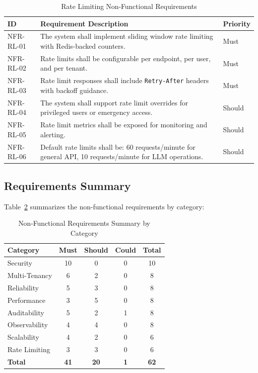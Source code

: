 \documentclass[a4paper,twoside]{sapthesis}
\begin{document}
\begin{table}[htbp]
\centering
\caption{Rate Limiting Non-Functional Requirements}
\label{tab:nfr-ratelimit}
\small
\begin{tabularx}{\textwidth}{|l|X|l|}
\hline
\textbf{ID} & \textbf{Requirement Description} & \textbf{Priority} \\
\midrule
NFR-RL-01 & The system shall implement sliding window rate limiting with Redis-backed counters. & Must \\
\midrule
NFR-RL-02 & Rate limits shall be configurable per endpoint, per user, and per tenant. & Must \\
\midrule
NFR-RL-03 & Rate limit responses shall include \texttt{Retry-After} headers with backoff guidance. & Must \\
\midrule
NFR-RL-04 & The system shall support rate limit overrides for privileged users or emergency access. & Should \\
\midrule
NFR-RL-05 & Rate limit metrics shall be exposed for monitoring and alerting. & Should \\
\midrule
NFR-RL-06 & Default rate limits shall be: 60 requests/minute for general API, 10 requests/minute for LLM operations. & Should \\
\midrule
\end{tabularx}
\end{table}

\subsection{Requirements Summary}
\label{subsec:nfr-summary}

Table~\ref{tab:nfr-summary} summarizes the non-functional requirements by category:

\begin{table}[htbp]
\centering
\caption{Non-Functional Requirements Summary by Category}
\label{tab:nfr-summary}
\begin{tabular}{|l|c|c|c|c|}
\hline
\textbf{Category} & \textbf{Must} & \textbf{Should} & \textbf{Could} & \textbf{Total} \\
\midrule
Security & 10 & 0 & 0 & 10 \\
Multi-Tenancy & 6 & 2 & 0 & 8 \\
Reliability & 5 & 3 & 0 & 8 \\
Performance & 3 & 5 & 0 & 8 \\
Auditability & 5 & 2 & 1 & 8 \\
Observability & 4 & 4 & 0 & 8 \\
Scalability & 4 & 2 & 0 & 6 \\
Rate Limiting & 3 & 3 & 0 & 6 \\
\midrule
\textbf{Total} & \textbf{41} & \textbf{20} & \textbf{1} & \textbf{62} \\
\midrule
\end{tabular}
\end{table}
\end{document}
